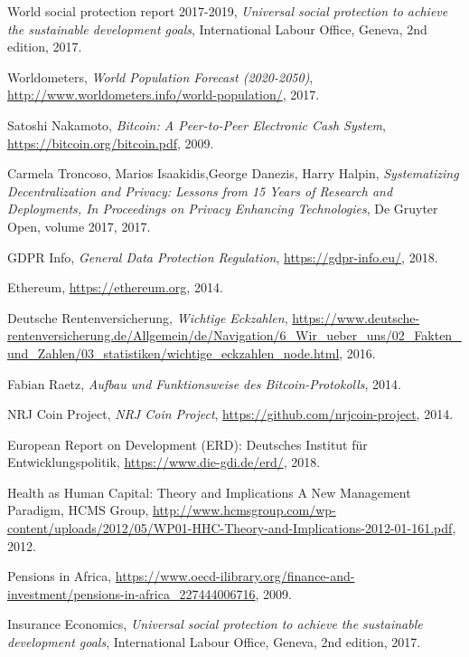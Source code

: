 \begin{thebibliography}{9}

  World social protection report 2017-2019,
   \textit{Universal social protection to achieve the sustainable development goals},
  International Labour Office, Geneva,
  2nd edition,
  2017.

  Worldometers,
  \textit{World Population Forecast (2020-2050)},
  \url{http://www.worldometers.info/world-population/},
  2017.  

  Satoshi Nakamoto,
  \textit{Bitcoin: A Peer-to-Peer Electronic Cash System},
  \url{https://bitcoin.org/bitcoin.pdf},
  2009.
  
  Carmela Troncoso, Marios Isaakidis,George Danezis, Harry Halpin,
  \textit{Systematizing Decentralization and Privacy: Lessons from 15 Years of Research and Deployments, In Proceedings on Privacy Enhancing Technologies},
  De Gruyter Open,
  volume 2017,
  2017.

  
  GDPR Info,
  \textit{General Data Protection Regulation},
  \url{https://gdpr-info.eu/},
  2018. 
  
  Ethereum,
  \url{https://ethereum.org},
  2014.

  Deutsche Rentenversicherung,
  \textit{Wichtige Eckzahlen},
  \url{https://www.deutsche-rentenversicherung.de/Allgemein/de/Navigation/6_Wir_ueber_uns/02_Fakten_und_Zahlen/03_statistiken/wichtige_eckzahlen_node.html},
  2016.

  Fabian Raetz,
  \textit{Aufbau und Funktionsweise des Bitcoin-Protokolls},
  2014.  

  NRJ Coin Project,
  \textit{NRJ Coin Project},
  \url{https://github.com/nrjcoin-project},
  2014.

  European Report on Development (ERD): Deutsches Institut für Entwicklungspolitik,
  \url{https://www.die-gdi.de/erd/},
  2018.
  
  Health as Human Capital: Theory and Implications A New Management Paradigm, HCMS Group,
  \url{http://www.hcmsgroup.com/wp-content/uploads/2012/05/WP01-HHC-Theory-and-Implications-2012-01-161.pdf},
  2012.
 
 Pensions in Africa,
  \url{https://www.oecd-ilibrary.org/finance-and-investment/pensions-in-africa_227444006716},
  2009.
  
 Insurance Economics,
   \textit{Universal social protection to achieve the sustainable development goals},
  International Labour Office, Geneva,
  2nd edition,
  2017.
  
\end{thebibliography}

